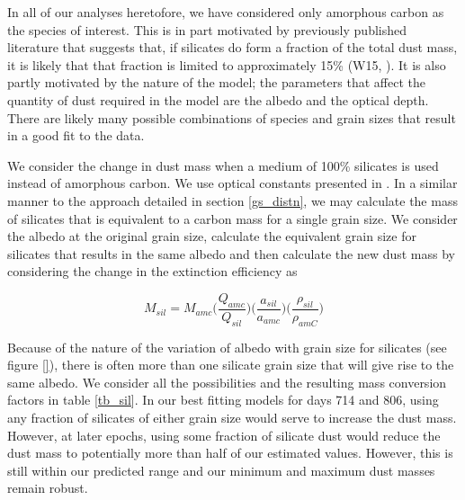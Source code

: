 \documentclass[useAMS,usenatbib,usegraphicx]{mnras}
\begin{document}
In all of our analyses heretofore, we have considered only amorphous carbon as the species of interest.  This is in part motivated by previously published literature that suggests that, if silicates do form a fraction of the total dust mass, it is likely that that fraction is limited to approximately 15\% (W15, \citet{Ercolano2007}).  It is also partly motivated by the nature of the model; the parameters that affect the quantity of dust required in the model are the albedo and the optical depth.  There are likely many possible combinations of species and grain sizes that result in a good fit to the data.  

We consider the change in dust mass when a medium of 100\% silicates is used instead of amorphous carbon.  We use optical constants presented in \cite{Draine1984}.  In a similar manner to the approach detailed in section \ref{gs_distn}, we may calculate the mass of silicates that is equivalent to a carbon mass for a single grain size.  We consider the albedo at the original grain size, calculate the equivalent grain size for silicates that results in the same albedo and then calculate the new dust mass by considering the change in the extinction efficiency as

\begin{equation}
M_{sil} = M_{amc} \Big( \frac{Q_{amc}}{Q_{sil}} \Big) \Big(\frac{a_{sil}}{a_{amc}}\Big) \Big(\frac{\rho_{sil}}{\rho_{amC}}\Big)
\end{equation}

Because of the nature of the variation of albedo with grain size for silicates (see figure \ref{}), there is often more than one silicate grain size that will give rise to the same albedo.  We consider all the possibilities and the resulting mass conversion factors in table \ref{tb_sil}.  In our best fitting models for days 714 and 806, using any fraction of silicates of either grain size would serve to increase the dust mass.  However, at later epochs, using some fraction of silicate dust would reduce the dust mass to potentially more than half of our estimated values. However, this is still within our predicted range and our minimum and maximum dust masses remain robust.
\end{document}
